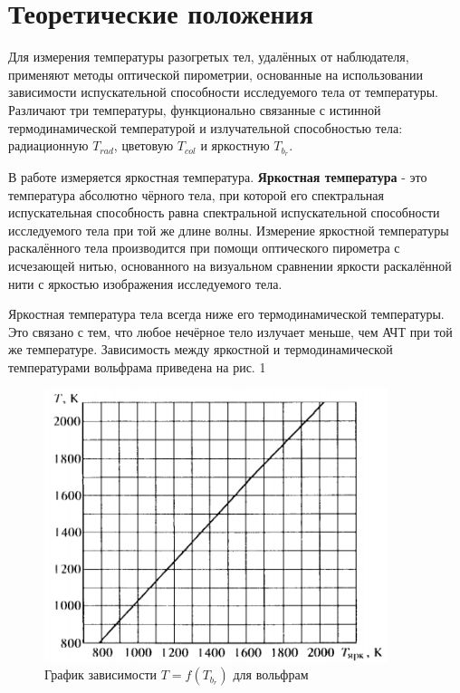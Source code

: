 \documentclass[a4paper]{article}
\begin{document}
\section{Теоретические положения}
Для измерения температуры разогретых тел, удалённых от наблюдателя, применяют методы оптической пирометрии, основанные на использовании зависимости испускательной способности исследуемого тела от температуры. Различают три температуры, функционально связанные с истинной термодинамической температурой и излучательной способностью тела: радиационную $T_{rad}$, цветовую $T_{col}$ и яркостную $T_b_r$. \par
В работе измеряется яркостная температура. \textbf{Яркостная температура} - это температура абсолютно чёрного тела, при которой его спектральная испускательная способность равна спектральной испускательной способности исследуемого тела при той же длине волны.
 Измерение яркостной температуры раскалённого тела производится при помощи оптического пирометра с исчезающей нитью, основанного на визуальном сравнении яркости раскалённой нити с яркостью изображения исследуемого тела. \par
Яркостная температура тела всегда ниже его термодинамической температуры. Это связано с тем, что любое нечёрное тело излучает меньше, чем АЧТ при той же температуре. Зависимость между яркостной и термодинамической температурами вольфрама приведена на рис. 1

\begin{figure}[h]
    \centering
    \includegraphics[width=10cm]{fig2.PNG}
    \caption{График зависимости $T = f(T_b_r)$ для вольфрам}
    \label{fig:vac}
\end{figure}
\end{document}
